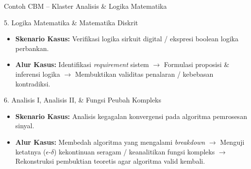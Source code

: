 \documentclass[aspectratio=169]{beamer} %
\begin{document}
\begin{frame}{Contoh CBM – Klaster Analisis \& Logika Matematika}
    \begin{block}{5. Logika Matematika \& Matematika Diskrit}
        \begin{itemize}
            \item \textbf{Skenario Kasus:} Verifikasi logika sirkuit digital / ekspresi boolean logika perbankan.
            \item \textbf{Alur Kasus:} Identifikasi \textit{requirement} sistem $\rightarrow$ Formulasi proposisi \& inferensi logika $\rightarrow$ Membuktikan validitas penalaran / kebebasan kontradiksi.
        \end{itemize}
    \end{block}

    \begin{block}{6. Analisis I, Analisis II, \& Fungsi Peubah Kompleks}
        \begin{itemize}
            \item \textbf{Skenario Kasus:} Analisis kegagalan konvergensi pada algoritma pemrosesan sinyal.
            \item \textbf{Alur Kasus:} Membedah algoritma yang mengalami \textit{breakdown} $\rightarrow$ Menguji ketatnya ($\epsilon$-$\delta$) kekontinuan seragam / keanalitikan fungsi kompleks $\rightarrow$ Rekonstruksi pembuktian teoretis agar algoritma valid kembali.
        \end{itemize}
    \end{block}
\end{frame}
\end{document}
